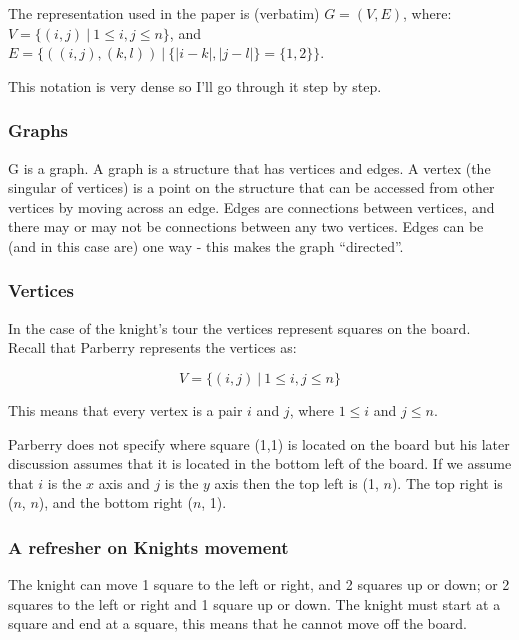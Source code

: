 \documentclass[11pt, a4paper]{article}
\begin{document}
The representation used in the paper is (verbatim) $G = (V,E)$, where: $V = \{(i,j)\ |\ 1 \le i,j \le n\}$, and $E = \{((i,j),(k,l))\ |\ \{|i-k|,|j-l|\} = \{1,2\}\}$.

This notation is very dense so I'll go through it step by step.

\subsubsection{Graphs}

G is a graph. A graph is a structure that has vertices and edges. A vertex (the singular of vertices) is a point on the structure that can be accessed from other vertices by moving across an edge. Edges are connections between vertices, and there may or may not be connections between any two vertices. Edges can be (and in this case are) one way - this makes the graph ``directed''.

\subsubsection{Vertices}

In the case of the knight's tour the vertices represent squares on the board. Recall that Parberry represents the vertices as:

$$V = \{(i,j)\ |\ 1 \le i,j \le n\}$$

This means that every vertex is a pair $i$ and $j$, where $1 \le i$ and $j \le n$.

Parberry does not specify where square (1,1) is located on the board but his later discussion assumes that it is located in the bottom left of the board. If we assume that $i$ is the $x$ axis and $j$ is the $y$ axis then the top left is (1, $n$). The top right is ($n$, $n$), and the bottom right ($n$, 1).


\subsubsection{A refresher on Knights movement}

The knight can move 1 square to the left or right, and 2 squares up or down; or 2 squares to the left or right and 1 square up or down. The knight must start at a square and end at a square, this means that he cannot move off the board.

\end{document}
